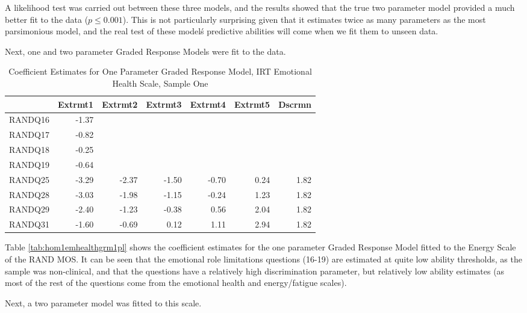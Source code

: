 \documentclass{article}
\begin{document}
A likelihood test was carried out between these three models, and the results showed that the true two parameter model provided a much better fit to the data ($p \le 0.001$).  This is not particularly surprising given that it estimates twice as many parameters as the most parsimonious model, and the real test of these model\'s predictive abilities will come when we fit them to unseen data.

Next, one and two parameter Graded Response Models were fit to the data. 



\begin{table}[ht]
\centering
\begin{tabular}{rrrrrrr}
  \hline
 & Extrmt1 & Extrmt2 & Extrmt3 & Extrmt4 & Extrmt5 & Dscrmn \\ 
  \hline
RANDQ16 & -1.37 &  &  &  &  &  \\ 
  RANDQ17 & -0.82 &  &  &  &  &  \\ 
  RANDQ18 & -0.25 &  &  &  &  &  \\ 
  RANDQ19 & -0.64 &  &  &  &  &  \\ 
  RANDQ25 & -3.29 & -2.37 & -1.50 & -0.70 & 0.24 & 1.82 \\ 
  RANDQ28 & -3.03 & -1.98 & -1.15 & -0.24 & 1.23 & 1.82 \\ 
  RANDQ29 & -2.40 & -1.23 & -0.38 & 0.56 & 2.04 & 1.82 \\ 
  RANDQ31 & -1.60 & -0.69 & 0.12 & 1.11 & 2.94 & 1.82 \\ 
   \hline
\end{tabular}
\caption{Coefficient Estimates for One Parameter Graded Response Model, IRT Emotional Health Scale, Sample One} 
\label{tab:hom1memhealthgrm1pl}
\end{table}
Table \ref{tab:hom1emhealthgrm1pl} shows the coefficient estimates for the one parameter Graded Response Model fitted to the Energy Scale of the RAND MOS. It can be seen that the emotional role limitations questions (16-19) are estimated at quite low ability thresholds, as the sample was non-clinical, and that the questions have a relatively high discrimination parameter, but relatively low ability estimates (as most of the rest of the questions come from the emotional health and energy/fatigue scales). 

Next, a two parameter model was fitted to this scale. 
\end{document}
